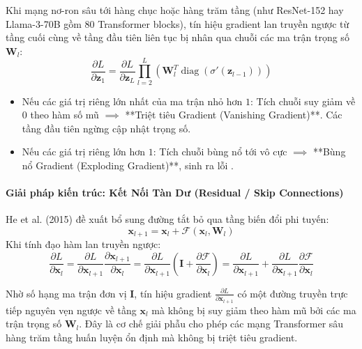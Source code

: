 Khi mạng nơ-ron sâu tới hàng chục hoặc hàng trăm tầng (như ResNet-152 hay Llama-3-70B gồm 80 Transformer blocks), tín hiệu gradient lan truyền ngược từ tầng cuối cùng về tầng đầu tiên liên tục bị nhân qua chuỗi các ma trận trọng số $\mathbf{W}_l$:
\begin{equation}
\frac{\partial L}{\partial \mathbf{z}_1} = \frac{\partial L}{\partial \mathbf{z}_L} \prod_{l=2}^L \left( \mathbf{W}_l^T \operatorname{diag}(\sigma'(\mathbf{z}_{l-1})) \right)
\end{equation}
\begin{itemize}
  \item Nếu các giá trị riêng lớn nhất của ma trận nhỏ hơn $1$: Tích chuỗi suy giảm về $0$ theo hàm số mũ $\implies$ **Triệt tiêu Gradient (Vanishing Gradient)**. Các tầng đầu tiên ngừng cập nhật trọng số.
  \item Nếu các giá trị riêng lớn hơn $1$: Tích chuỗi bùng nổ tới vô cực $\implies$ **Bùng nổ Gradient (Exploding Gradient)**, sinh ra lỗi .
\end{itemize}

\paragraph{Giải pháp kiến trúc: Kết Nối Tàn Dư (Residual / Skip Connections)}
He et al. (2015) đề xuất bổ sung đường tắt bỏ qua tầng biến đổi phi tuyến:
\begin{equation}
\mathbf{x}_{l+1} = \mathbf{x}_l + \mathcal{F}(\mathbf{x}_l, \mathbf{W}_l)
\label{eq:residual-connection-def}
\end{equation}
Khi tính đạo hàm lan truyền ngược:
\begin{equation}
\frac{\partial L}{\partial \mathbf{x}_l} = \frac{\partial L}{\partial \mathbf{x}_{l+1}} \frac{\partial \mathbf{x}_{l+1}}{\partial \mathbf{x}_l} = \frac{\partial L}{\partial \mathbf{x}_{l+1}} \left( \mathbf{I} + \frac{\partial \mathcal{F}}{\partial \mathbf{x}_l} \right) = \frac{\partial L}{\partial \mathbf{x}_{l+1}} + \frac{\partial L}{\partial \mathbf{x}_{l+1}} \frac{\partial \mathcal{F}}{\partial \mathbf{x}_l}
\label{eq:residual-gradient-highway}
\end{equation}

\begin{theorem}
Nhờ số hạng ma trận đơn vị $\mathbf{I}$, tín hiệu gradient $\frac{\partial L}{\partial \mathbf{x}_{l+1}}$ có một đường truyền trực tiếp nguyên vẹn ngược về tầng $\mathbf{x}_l$ mà không bị suy giảm theo hàm mũ bởi các ma trận trọng số $\mathbf{W}_l$. Đây là cơ chế giải phẫu cho phép các mạng Transformer sâu hàng trăm tầng huấn luyện ổn định mà không bị triệt tiêu gradient.
\end{theorem}

